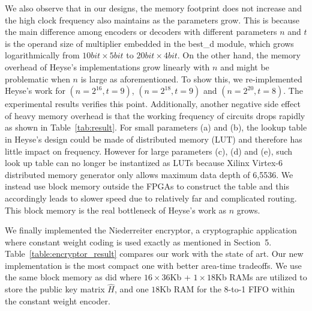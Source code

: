 \documentclass[10pt,journal,compsoc]{IEEEtran}
\begin{document}
We also observe  that in our designs, the memory footprint does not increase and the high clock frequency also maintains as the parameters grow. This is because the main difference among encoders or decoders with different parameters $n$ and $t$ is the operand size of multiplier embedded in the best\_d module, which grows logarithmically from $10 bit\times5bit$ to $20bit\times 4bit$. On the other hand, the memory overhead of Heyse's implementations grow linearly with $n$ and might be problematic when $n$ is large as aforementioned. To show this, we re-implemented Heyse's work for  $(n=2^{16}, t=9)$, $(n=2^{18},t=9)$ and $(n=2^{20},t=8)$. The experimental results verifies this point.
Additionally, another negative side effect of heavy memory overhead is that the working frequency of circuits drops rapidly as shown in Table~\ref{tab:result}. For small parameters (a) and (b), the lookup table in Heyse's design could be made of distributed memory (LUT) and therefore has
little impact on frequency. However for large parameters (c), (d) and (e), such look up table can no longer be instantized as LUTs because Xilinx Virtex-6 distributed memory generator only allows maximum data depth of 6,5536. We instead use block memory outside the FPGAs to construct the table and this accordingly leads to  slower speed due to relatively far and complicated routing. This block memory is the real bottleneck of
Heyse's work as $n$ grows.

We finally implemented the Niederreiter encryptor, a cryptographic application where constant weight coding is used exactly as mentioned in
Section~5. Table~\ref{table:encryptor_result} compares our work with the state of art\cite{heyse2012towards}. Our new implementation is the most compact one with better area-time tradeoffs.
We use the same block memory as \cite{heyse2012towards} did where $16\times 36$Kb + $1\times 18$Kb RAMs are utilized to store the public key matrix $\hat{H}$,
and one $18$Kb RAM for the 8-to-1 FIFO within the constant weight encoder.
\end{document}
